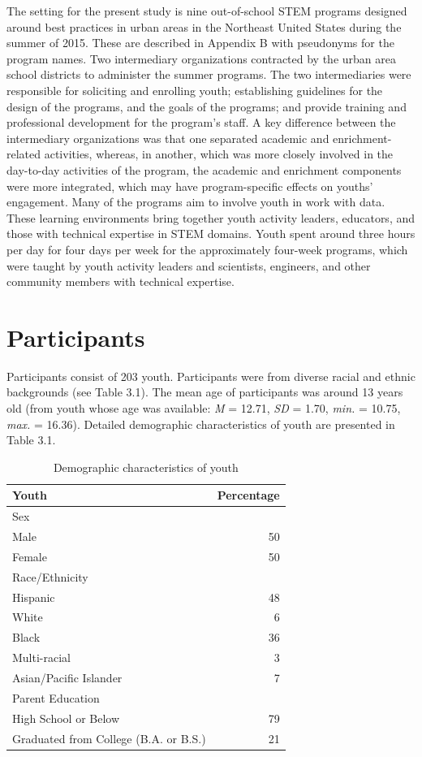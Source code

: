 \documentclass[]{book}
\theoremstyle{definition}
\theoremstyle{definition}
\theoremstyle{definition}
\theoremstyle{remark}
\begin{document}
The setting for the present study is nine out-of-school STEM programs
designed around best practices in urban areas in the Northeast United
States during the summer of 2015. These are described in Appendix B with
pseudonyms for the program names. Two intermediary organizations
contracted by the urban area school districts to administer the summer
programs. The two intermediaries were responsible for soliciting and
enrolling youth; establishing guidelines for the design of the programs,
and the goals of the programs; and provide training and professional
development for the program's staff. A key difference between the
intermediary organizations was that one separated academic and
enrichment-related activities, whereas, in another, which was more
closely involved in the day-to-day activities of the program, the
academic and enrichment components were more integrated, which may have
program-specific effects on youths' engagement. Many of the programs aim
to involve youth in work with data. These learning environments bring
together youth activity leaders, educators, and those with technical
expertise in STEM domains. Youth spent around three hours per day for
four days per week for the approximately four-week programs, which were
taught by youth activity leaders and scientists, engineers, and other
community members with technical expertise.

\section{Participants}\label{participants}

Participants consist of 203 youth. Participants were from diverse racial
and ethnic backgrounds (see Table 3.1). The mean age of participants was
around 13 years old (from youth whose age was available: \emph{M} =
12.71, \emph{SD} = 1.70, \emph{min.} = 10.75, \emph{max.} = 16.36).
Detailed demographic characteristics of youth are presented in Table
3.1.

\begin{table}

\caption{\label{tab:unnamed-chunk-3}Demographic characteristics of youth}
\centering
\begin{tabular}[t]{lr}
\toprule
Youth & Percentage\\
\midrule
Sex & \\
Male & 50\\
Female & 50\\
Race/Ethnicity & \\
Hispanic & 48\\
\addlinespace
White & 6\\
Black & 36\\
Multi-racial & 3\\
Asian/Pacific Islander & 7\\
Parent Education & \\
\addlinespace
High School or Below & 79\\
Graduated from College (B.A. or B.S.) & 21\\
\bottomrule
\end{tabular}
\end{table}
\end{document}
